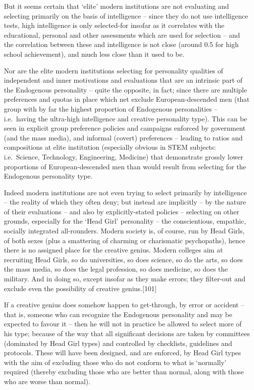 \documentclass[
]{book}
\begin{document}
But it seems certain that `elite' modern institutions are not evaluating and selecting primarily on the basis of intelligence -- since they do not use intelligence tests, high intelligence is only selected-for insofar as it correlates with the educational, personal and other assessments which are used for selection -- and the correlation between these and intelligence is not close (around 0.5 for high school achievement), and much less close than it used to be.

Nor are the elite modern institutions selecting for personality qualities of independent and inner motivations and evaluations that are an intrinsic part of the Endogenous personality -- quite the opposite, in fact; since there are multiple preferences and quotas in place which net exclude European-descended men (that group with by far the highest proportion of Endogenous personalities -- i.e.~having the ultra-high intelligence and creative personality type). This can be seen in explicit group preference policies and campaigns enforced by government (and the mass media), and informal (covert) preferences -- leading to ratios and compositions at elite institution (especially obvious in STEM subjects: i.e.~Science, Technology, Engineering, Medicine) that demonstrate grossly lower proportions of European-descended men than would result from selecting for the Endogenous personality type.

Indeed modern institutions are not even trying to select primarily by intelligence -- the reality of which they often deny; but instead are implicitly -- by the nature of their evaluations -- and also by explicitly-stated policies -- selecting on other grounds, especially for the `Head Girl' personality -- the conscientious, empathic, socially integrated all-rounders. Modern society is, of course, run by Head Girls, of both sexes (plus a smattering of charming or charismatic psychopaths), hence there is no assigned place for the creative genius. Modern colleges aim at recruiting Head Girls, so do universities, so does science, so do the arts, so does the mass media, so does the legal profession, so does medicine, so does the military. And in doing so, except insofar as they make errors; they filter-out and exclude even the possibility of creative genius.{[}101{]}

If a creative genius does somehow happen to get-through, by error or accident -- that is, someone who can recognize the Endogenous personality and may be expected to favour it -- then he will not in practice be allowed to select more of his type; because of the way that all significant decisions are taken by committees (dominated by Head Girl types) and controlled by checklists, guidelines and protocols. These will have been designed, and are enforced, by Head Girl types with the aim of excluding those who do not conform to what is `normally' required (thereby excluding those who are better than normal, along with those who are worse than normal).
\end{document}
